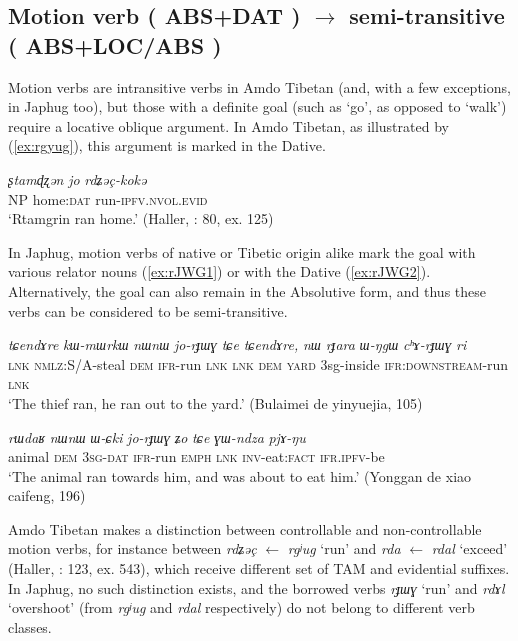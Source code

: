 \documentclass[oneside,a4paper,11pt]{article}
\makeatletter
\newcommand{\ipa}[1]{{\phon\textit{\mbox{#1}}}} %
\newcommand{\refb}[1]{(\ref{#1})}
\def\fakesc#1{%
  \begingroup%
  \xdef\fake@name{\csname\curr@fontshape/\f@size\endcsname}%
  \fontsize{\fontdimen8\fake@name}{\baselineskip}\selectfont%
  \uppercase{#1}%
  \endgroup%
}
\makeatother
\begin{document}
\subsection{Motion verb (\fakesc{abs+dat}) $\rightarrow$ semi-transitive (\fakesc{abs+loc/abs})}  
Motion verbs are intransitive verbs in Amdo Tibetan (and, with a few exceptions, in Japhug too), but those with a definite goal (such as `go', as opposed to `walk') require a locative oblique argument. In Amdo Tibetan, as illustrated by \refb{ex:rgyug}, this argument is marked in the Dative.

\begin{exe}
\ex \label{ex:rgyug}
\gll
\ipa{ʂtamɖʐən} 	\ipa{jo} \ipa{rdʑəç-kokə} 	 \\
NP home:\textsc{dat} run-\textsc{ipfv.nvol.evid} \\
\glt `Rtamgrin ran home.' (Haller, \citeyear{haller04themchen}: 80, ex. 125)
\end{exe}

In Japhug, motion verbs of native or Tibetic origin alike mark the goal with various relator nouns (\ref{ex:rJWG1}) or with the Dative (\ref{ex:rJWG2}). Alternatively, the goal can also remain in the Absolutive form, and thus these verbs can be considered to be semi-transitive. 

\begin{exe}
\ex \label{ex:rJWG1}
\gll
\ipa{tɕendɤre}  	\ipa{kɯ-mɯrkɯ}  	\ipa{nɯnɯ}  	\ipa{jo-rɟɯɣ}  	\ipa{tɕe}  	\ipa{tɕendɤre,}  	\ipa{nɯ}  	\ipa{rɟara}  	\ipa{ɯ-ŋgɯ}  	\ipa{cʰɤ-rɟɯɣ}  	\ipa{ri}  \\
\textsc{lnk} \textsc{nmlz}:S/A-steal \textsc{dem} \textsc{ifr}-run \textsc{lnk} \textsc{lnk} \textsc{dem} \textsc{yard} 3sg-inside \textsc{ifr:downstream}-run \textsc{lnk} \\
\glt `The thief ran, he ran out to the yard.' (Bulaimei de yinyuejia, 105)
\end{exe}

\begin{exe}
\ex \label{ex:rJWG2}
\gll
\ipa{rɯdaʁ}  	\ipa{nɯnɯ}  	\ipa{ɯ-ɕki}  	\ipa{jo-rɟɯɣ}  	\ipa{ʑo}  	\ipa{tɕe}  	\ipa{ɣɯ-ndza}  	\ipa{pjɤ-ŋu}  \\
animal \textsc{dem} \textsc{3sg-dat} \textsc{ifr}-run \textsc{emph} \textsc{lnk} \textsc{inv}-eat:\textsc{fact} \textsc{ifr.ipfv}-be \\
\glt `The animal ran towards him, and was about to eat him.' (Yonggan de xiao caifeng, 196)
\end{exe}


Amdo Tibetan makes a distinction between controllable and non-controllable motion verbs, for instance between \ipa{rdʑəç} $\leftarrow$ \ipa{rgʲug} `run' and \ipa{rda} $\leftarrow$ \ipa{rdal} `exceed' (Haller, \citeyear{haller04themchen}: 123, ex. 543), which receive different set of TAM and evidential suffixes. In Japhug, no such distinction exists, and  the borrowed verbs \ipa{rɟɯɣ} `run' and \ipa{rdɤl} `overshoot' (from \ipa{rgʲug} and \ipa{rdal} respectively) do not belong to different verb classes.
\end{document}
